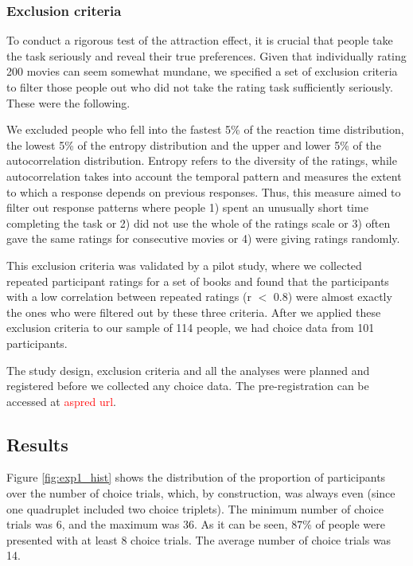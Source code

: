 \documentclass[11pt,a4paper]{article}
\begin{document}
 
 


\subsubsection{Exclusion criteria} \label{exclusion_ref}

To conduct a rigorous test of the attraction effect, it is crucial that people take the task seriously and reveal their true preferences. Given that individually rating 200 movies can seem somewhat mundane, we specified a set of exclusion criteria to filter those people out who did not take the rating task sufficiently seriously. These were the following. 

We excluded people who fell into the fastest 5\% of the reaction time distribution, the lowest 5\% of the entropy distribution and the upper and lower 5\% of the autocorrelation distribution. Entropy refers to the diversity of the ratings, while autocorrelation takes into account the temporal pattern and measures the extent to which a response depends on previous responses. Thus, this measure aimed to filter out response patterns where people 1) spent an unusually short time completing the task or 2) did not use the whole of the ratings scale or 3) often gave the same ratings for consecutive movies or 4) were giving ratings randomly.

This exclusion criteria was validated by a pilot study, where we collected repeated participant ratings for a set of books and found that the participants with a low correlation between repeated ratings (r $<$ 0.8) were almost exactly the ones who were filtered out by these three criteria. After we applied these exclusion criteria to our sample of 114 people, we had choice data from 101 participants.

The study design, exclusion criteria and all the analyses were planned and registered before we collected any choice data. The pre-registration can be accessed at \textcolor{red}{aspred url}. 


\subsection{Results}

Figure \ref{fig:exp1_hist} shows the distribution of the proportion of participants over the number of choice trials, which, by construction, was always even (since one quadruplet included two choice triplets). The minimum number of choice trials was 6, and the maximum was 36. As it can be seen, 87\% of people were presented with at least 8 choice trials. The average number of choice trials was 14.
\end{document}

